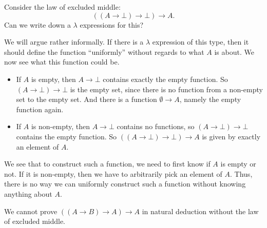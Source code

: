 \documentclass[a4paper]{article}
\begin{document}
\begin{eg}
  Consider the law of excluded middle:
  \[
    ((A \to \bot) \to \bot) \to A.
  \]
  Can we write down a $\lambda$ expressions for this?

  We will argue rather informally. If there is a $\lambda$ expression of this type, then it should define the function ``uniformly'' without regards to what $A$ is about. We now see what this function could be.
  \begin{itemize}
    \item If $A$ is empty, then $A \to \bot$ contains exactly the empty function. So $(A\to \bot) \to \bot$ is the empty set, since there is no function from a non-empty set to the empty set. And there is a function $\emptyset \to A$, namely the empty function again.
    \item If $A$ is non-empty, then $A \to \bot$ contains no functions, so $(A \to \bot) \to \bot$ contains the empty function. So $((A \to \bot) \to \bot) \to A$ is given by exactly an element of $A$.
  \end{itemize}
  We see that to construct such a function, we need to first know if $A$ is empty or not. If it is non-empty, then we have to arbitrarily pick an element of $A$. Thus, there is no way we can uniformly construct such a function without knowing anything about $A$.
\end{eg}

\begin{prop}
  We cannot prove $((A \to B) \to A) \to A$ in natural deduction without the law of excluded middle.
\end{prop}
\end{document}
